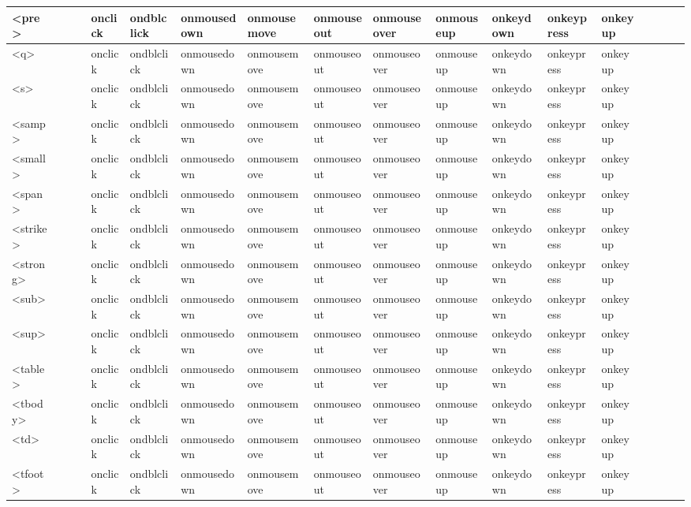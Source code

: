 \begin{longtable}{|p{18pt}|p{15pt}|p{15pt}|p{10pt}|p{16pt}|p{16pt}|p{16pt}|p{16pt}|p{16pt}|p{16pt}|p{16pt}|p{16pt}|p{16pt}|p{16pt}|p{16pt}|p{16pt}|p{16pt}|p{16pt}|}
\hline
<pre>		&	&	&	& onclick	& ondblclick & onmousedown & onmousemove & onmouseout & onmouseover & onmouseup & onkeydown & onkeypress & onkeyup & & & & \\
\hline
<q>			&	&	&	& onclick	& ondblclick & onmousedown & onmousemove & onmouseout & onmouseover & onmouseup & onkeydown & onkeypress & onkeyup & & & & \\
\hline
<s>			&	&	&	& onclick	& ondblclick & onmousedown & onmousemove & onmouseout & onmouseover & onmouseup & onkeydown & onkeypress & onkeyup & & & & \\
\hline
<samp>		&	&	&	& onclick	& ondblclick & onmousedown & onmousemove & onmouseout & onmouseover & onmouseup & onkeydown & onkeypress & onkeyup & & & & \\
\hline
<small>		&	&	&	& onclick	& ondblclick & onmousedown & onmousemove & onmouseout & onmouseover & onmouseup & onkeydown & onkeypress & onkeyup & & & & \\
\hline
<span>		&	&	&	& onclick	& ondblclick & onmousedown & onmousemove & onmouseout & onmouseover & onmouseup & onkeydown & onkeypress & onkeyup & & & & \\
\hline
<strike>		&	&	&	& onclick	& ondblclick & onmousedown & onmousemove & onmouseout & onmouseover & onmouseup & onkeydown & onkeypress & onkeyup & & & & \\
\hline
<strong>		&	&	&	& onclick	& ondblclick & onmousedown & onmousemove & onmouseout & onmouseover & onmouseup & onkeydown & onkeypress & onkeyup & & & & \\
\hline
<sub>		&	&	&	& onclick	& ondblclick & onmousedown & onmousemove & onmouseout & onmouseover & onmouseup & onkeydown & onkeypress & onkeyup & & & & \\
\hline
<sup>		&	&	&	& onclick	& ondblclick & onmousedown & onmousemove & onmouseout & onmouseover & onmouseup & onkeydown & onkeypress & onkeyup & & & & \\
\hline
<table>		&	&	&	& onclick	& ondblclick & onmousedown & onmousemove & onmouseout & onmouseover & onmouseup & onkeydown & onkeypress & onkeyup & & & & \\
\hline
<tbody>		&	&	&	& onclick	& ondblclick & onmousedown & onmousemove & onmouseout & onmouseover & onmouseup & onkeydown & onkeypress & onkeyup & & & & \\
\hline
<td>			&	&	&	& onclick	& ondblclick & onmousedown & onmousemove & onmouseout & onmouseover & onmouseup & onkeydown & onkeypress & onkeyup & & & & \\
\hline
<tfoot>		&	&	&	& onclick	& ondblclick & onmousedown & onmousemove & onmouseout & onmouseover & onmouseup & onkeydown & onkeypress & onkeyup & & & & \\

\end{longtable}
